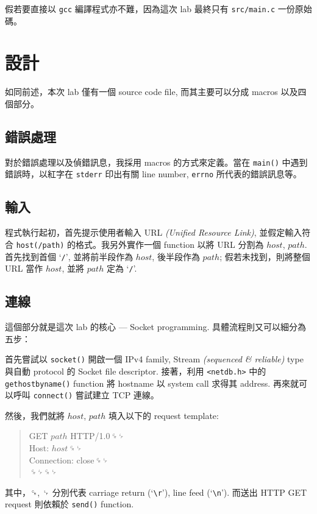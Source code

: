 \documentclass[12pt, a4paper]{article}
\begin{document}
假若要直接以 \texttt{gcc} 編譯程式亦不難，因為這次 lab 最終只有 \texttt{src/main.c} 一份原始碼。

\section{設計}

如同前述，本次 lab 僅有一個 source code file, 而其主要可以分成 macros 以及四個部分。

\subsection{錯誤處理}

對於錯誤處理以及偵錯訊息，我採用 macros 的方式來定義。當在 \texttt{main()} 中遇到錯誤時，以紅字在 \texttt{stderr} 印出有關 line number, \texttt{errno} 所代表的錯誤訊息等。

\subsection{輸入}

程式執行起初，首先提示使用者輸入 URL \textit{(Unified Resource Link)}, 並假定輸入符合 \texttt{host(/path)} 的格式。我另外實作一個 function 以將 URL 分割為 $host$, $path$. 首先找到首個 `\texttt{/}', 並將前半段作為 $host$, 後半段作為 $path$; 假若未找到，則將整個 URL 當作 $host$, 並將 $path$ 定為 `\texttt{/}'.

\subsection{連線}

這個部分就是這次 lab 的核心 --- \textsf{Socket} programming. 具體流程則又可以細分為五步：

首先嘗試以 \texttt{socket()} 開啟一個 \textsf{IPv4} family, \textsf{Stream} \textit{(sequenced \& reliable)} type 與自動 protocol 的 \textsf{Socket} file descriptor. 接著，利用 \texttt{<netdb.h>} 中的 \texttt{gethostbyname()} function 將 hostname 以 system call 求得其 address. 再來就可以呼叫 \texttt{connect()} 嘗試建立 \textsf{TCP} 連線。

然後，我們就將 $host$, $path$ 填入以下的 request template:
\begin{quote}
\ttfamily
GET $path$ HTTP/1.0{\ccpl\itshape␍␊}\\
Host: $host${\ccpl\itshape␍␊}\\
Connection: close{\ccpl\itshape␍␊}\\
{\ccpl\itshape␍␊␍␊}
\end{quote}
其中，{\ccpl␍}, {\ccpl␊} 分別代表 carriage return (`\texttt{\textbackslash r}'), line feed (`\texttt{\textbackslash n}'). 而送出 \textsf{HTTP GET} request 則依賴於 \texttt{send()} function.
\end{document}
